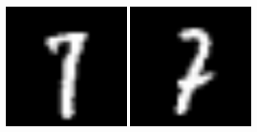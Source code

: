 \documentclass[10pt,handout]{beamer}
\begin{document}
\begin{frame}
    \begin{figure}[h]
        \begin{minipage}[c]{.46\linewidth}
        \centering
        \includegraphics[width=0.4\textwidth]{img/7_1.png}
        \end{minipage}
        \hfill%
        \begin{minipage}[c]{.46\linewidth}
        \centering
        \includegraphics[width=0.4\textwidth]{img/7_2.png}
        \end{minipage}
        \end{figure}
        

\end{frame}
\end{document}
